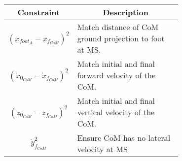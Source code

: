 \small
\begin{tabular}{|c|m{0.7\linewidth}|}
	\hline
	Constraint	& \multicolumn{1}{c|}{Description} \\
	\hline
	$ (x_{foot_A} - x_{f_{CoM}})^2 $	& Match distance of CoM ground projection to foot at MS. \\
	\hline
	$ (\dot{x}_{0_{CoM}} - \dot{x}_{f_{CoM}} )^2 $	&  Match initial and final forward velocity of the CoM. \\
	\hline
	$ (z_{0_{CoM}} - z_{f_{CoM}})^2 $	& Match initial and final vertical velocity of the CoM. \\
	\hline
	$ \dot{y}_{f_{CoM}}^2 $ & Ensure CoM has no lateral velocity at MS \\
	\hline
\end{tabular}

